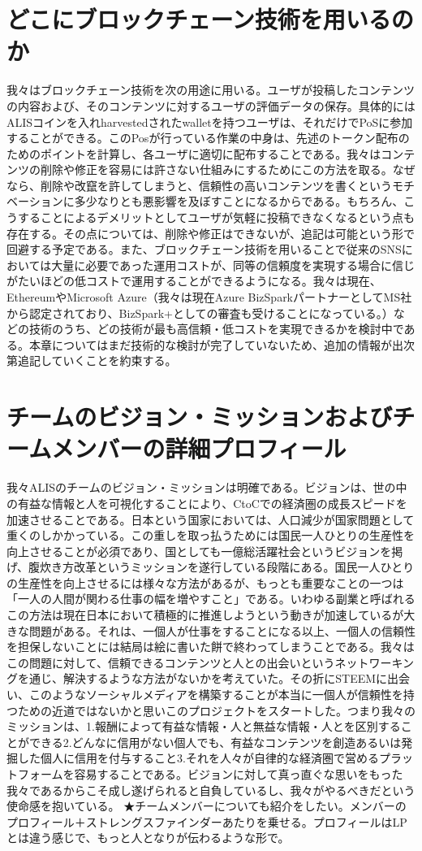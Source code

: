 \documentclass{jsarticle}
\begin{document}
\section{どこにブロックチェーン技術を用いるのか}
我々はブロックチェーン技術を次の用途に用いる。ユーザが投稿したコンテンツの内容および、そのコンテンツに対するユーザの評価データの保存。具体的にはALISコインを入れharvestedされたwalletを持つユーザは、それだけでPoSに参加することができる。このPosが行っている作業の中身は、先述のトークン配布のためのポイントを計算し、各ユーザに適切に配布することである。我々はコンテンツの削除や修正を容易には許さない仕組みにするためにこの方法を取る。なぜなら、削除や改竄を許してしまうと、信頼性の高いコンテンツを書くというモチベーションに多少なりとも悪影響を及ぼすことになるからである。もちろん、こうすることによるデメリットとしてユーザが気軽に投稿できなくなるという点も存在する。その点については、削除や修正はできないが、追記は可能という形で回避する予定である。また、ブロックチェーン技術を用いることで従来のSNSにおいては大量に必要であった運用コストが、同等の信頼度を実現する場合に信じがたいほどの低コストで運用することができるようになる。我々は現在、EthereumやMicrosoft Azure（我々は現在Azure BizSparkパートナーとしてMS社から認定されており、BizSpark+としての審査も受けることになっている。）などの技術のうち、どの技術が最も高信頼・低コストを実現できるかを検討中である。本章についてはまだ技術的な検討が完了していないため、追加の情報が出次第追記していくことを約束する。
\section{チームのビジョン・ミッションおよびチームメンバーの詳細プロフィール}
我々ALISのチームのビジョン・ミッションは明確である。ビジョンは、世の中の有益な情報と人を可視化することにより、CtoCでの経済圏の成長スピードを加速させることである。日本という国家においては、人口減少が国家問題として重くのしかかっている。この重しを取っ払うためには国民一人ひとりの生産性を向上させることが必須であり、国としても一億総活躍社会というビジョンを掲げ、腹炊き方改革というミッションを遂行している段階にある。国民一人ひとりの生産性を向上させるには様々な方法があるが、もっとも重要なことの一つは「一人の人間が関わる仕事の幅を増やすこと」である。いわゆる副業と呼ばれるこの方法は現在日本において積極的に推進しようという動きが加速しているが大きな問題がある。それは、一個人が仕事をすることになる以上、一個人の信頼性を担保しないことには結局は絵に書いた餅で終わってしまうことである。我々はこの問題に対して、信頼できるコンテンツと人との出会いというネットワーキングを通じ、解決するような方法がないかを考えていた。その折にSTEEMに出会い、このようなソーシャルメディアを構築することが本当に一個人が信頼性を持つための近道ではないかと思いこのプロジェクトをスタートした。つまり我々のミッションは、1.報酬によって有益な情報・人と無益な情報・人とを区別することができる2.どんなに信用がない個人でも、有益なコンテンツを創造あるいは発掘した個人に信用を付与すること3.それを人々が自律的な経済圏で営めるプラットフォームを容易することである。ビジョンに対して真っ直ぐな思いをもった我々であるからこそ成し遂げられると自負しているし、我々がやるべきだという使命感を抱いている。
★チームメンバーについても紹介をしたい。メンバーのプロフィール＋ストレングスファインダーあたりを乗せる。プロフィールはLPとは違う感じで、もっと人となりが伝わるような形で。
\end{document}
